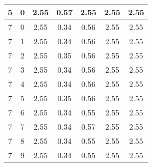 \begin{longtable}{|c|c||c||c|c||c|c|}
	5 & 0 & 2.55 & 0.57 & 2.55 & 2.55 & 2.55 \\ \hline
	7 & 0 & 2.55 & 0.34 & 0.56 & 2.55 & 2.55 \\ \hline
	7 & 1 & 2.55 & 0.34 & 0.56 & 2.55 & 2.55 \\ \hline
	7 & 2 & 2.55 & 0.35 & 0.56 & 2.55 & 2.55 \\ \hline
	7 & 3 & 2.55 & 0.34 & 0.56 & 2.55 & 2.55 \\ \hline
	7 & 4 & 2.55 & 0.34 & 0.56 & 2.55 & 2.55 \\ \hline
	7 & 5 & 2.55 & 0.35 & 0.56 & 2.55 & 2.55 \\ \hline
	7 & 6 & 2.55 & 0.34 & 0.55 & 2.55 & 2.55 \\ \hline
	7 & 7 & 2.55 & 0.34 & 0.57 & 2.55 & 2.55 \\ \hline
	7 & 8 & 2.55 & 0.34 & 0.55 & 2.55 & 2.55 \\ \hline
	7 & 9 & 2.55 & 0.34 & 0.55 & 2.55 & 2.55 \\ \hline
\end{longtable}
\clearpage{}
